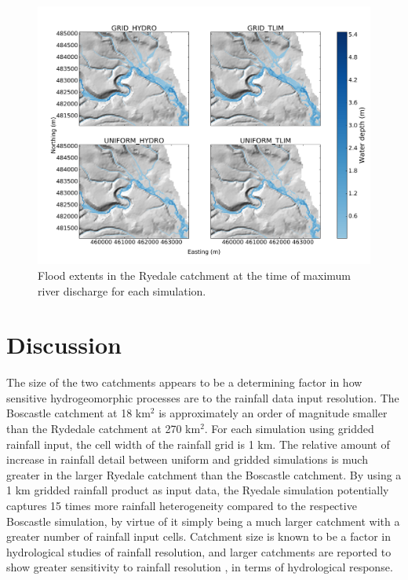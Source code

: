 \begin{figure}
\includegraphics[width=20cm]{chp06_figures_scripts/figure_ryedale_peak_flood_ensemble.png}
\caption{Flood extents in the Ryedale catchment at the time of maximum river discharge for each simulation.}
\label{fig_ryedale_2dplan_flood_ensemble}
\end{figure}



\section{Discussion}

The size of the two catchments appears to be a determining factor in how sensitive hydrogeomorphic processes are to the rainfall data input resolution. The Boscastle catchment at 18 km\(^2\) is approximately an order of magnitude smaller than the Rydedale catchment at 270 km\(^2\). For each simulation using gridded rainfall input, the cell width of the rainfall grid is 1 km. The relative amount of increase in rainfall detail between uniform and gridded simulations is much greater in the larger Ryedale catchment than the Boscastle catchment. By using a 1 km gridded rainfall product as input data, the Ryedale simulation potentially captures 15 times more rainfall heterogeneity compared to the respective Boscastle simulation, by virtue of it simply being a much larger catchment with a greater number of rainfall input cells. Catchment size is known to be a factor in hydrological studies of rainfall resolution, and larger catchments are reported to show greater sensitivity to rainfall resolution \citep[e.g.][]{nicotina2008impact}, in terms of hydrological response.

